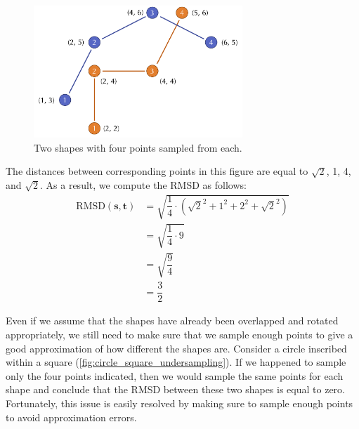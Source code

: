 \begin{figure}[h]
	\centering
	\mySfFamily
	\includegraphics[width = 0.7\textwidth]{../images/rmsd_simple_shapes.png}
	\caption{Two shapes with four points sampled from each.}
	\label{fig:rmsd_simple_shapes}
\end{figure}

The distances between corresponding points in this figure are equal to $\sqrt{2}$, 1, 4, and $\sqrt{2}$. As a result, we compute the RMSD as follows:
\begin{align*}
	\text{RMSD}(\mathbf{s}, \mathbf{t}) &= \sqrt{\dfrac{1}{4} \cdot (\sqrt{2}^2 + 1^2 + 2^2 + \sqrt{2}^2)} \\
	&= \sqrt{\dfrac{1}{4} \cdot 9}\\
	&= \sqrt{\dfrac{9}{4}}\\
	&= \dfrac{3}{2}
\end{align*}
\fudgespace

\begin{qbox}\end{qbox}

Even if we assume that the shapes have already been overlapped and rotated appropriately, we still need to make sure that we sample enough points to give a good approximation of how different the shapes are. Consider a circle inscribed within a square (\autoref{fig:circle_square_undersampling}). If we happened to sample only the four points indicated, then we would sample the same points for each shape and conclude that the RMSD between these two shapes is equal to zero. Fortunately, this issue is easily resolved by making sure to sample enough points to avoid approximation errors.\\

